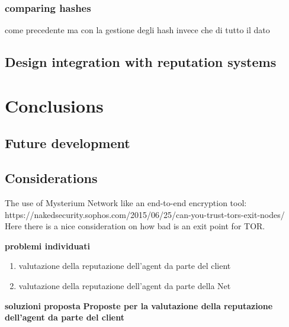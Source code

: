 \documentclass[]{article}
\begin{document}
		\subsubsection{comparing hashes}
		come precedente ma con la gestione degli hash invece che di tutto il dato


	\subsection{Design integration with reputation systems}

		
\section{Conclusions}
	\subsection{Future development}
	\subsection{Considerations}

	The use of Mysterium Network like an end-to-end encryption tool: https://nakedsecurity.sophos.com/2015/06/25/can-you-trust-tors-exit-nodes/
	Here there is a nice consideration on how bad is an exit point for TOR.

	\pagebreak

	\textbf{problemi individuati}
	\begin{enumerate}
		\item valutazione della reputazione dell'agent da parte del client
		\item valutazione della reputazione dell'agent da parte della Net
	\end{enumerate}
	
	\textbf{soluzioni proposta}
	\textbf{Proposte per la valutazione della reputazione dell'agent da parte del client}
	
\end{document}
